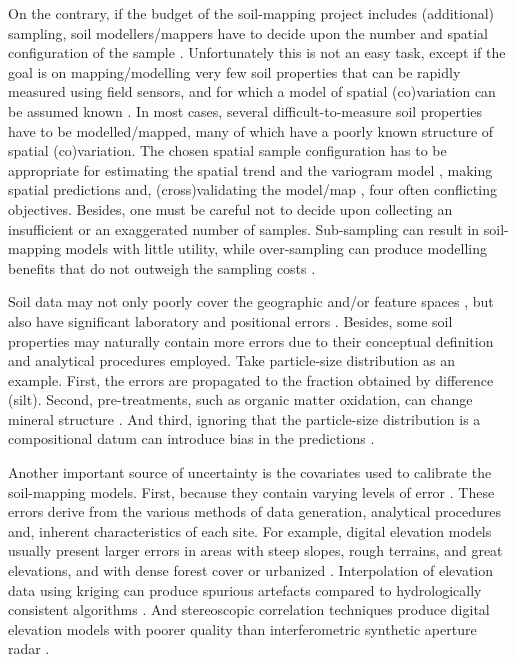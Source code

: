On the contrary, if the budget of the soil-mapping project includes (additional) sampling, soil 
modellers/mappers have to decide upon the number and spatial configuration of the sample 
\citep{deGruijterEtAl2006, WebsterEtAl2013}. Unfortunately this is not an easy task, except if the 
goal is on mapping/modelling very few soil properties that can be rapidly measured using field 
sensors, and for which a model of spatial (co)variation can be assumed known \citep{MarchantEtAl2006}.
In most cases, several difficult-to-measure soil properties have to be modelled/mapped, many of 
which have a poorly known structure of spatial (co)variation. The chosen spatial sample configuration
has to be appropriate for estimating the spatial trend \citep{HenglEtAl2003a, MinasnyEtAl2006b} and 
the variogram model \citep{WarrickEtAl1987, WebsterEtAl1992, Lark2002}, making spatial predictions 
\citep{YfantisEtAl1987, WalvoortEtAl2010} and, (cross)validating the model/map \citep{BrusEtAl2011}, 
four often conflicting objectives. Besides, one must be careful not to decide upon collecting an 
insufficient or an exaggerated number of samples. Sub-sampling can result in soil-mapping models 
with little utility, while over-sampling can produce modelling benefits that do not outweigh the
sampling costs \citep{vanGroenigenEtAl1999}.

Soil data may not only poorly cover the geographic and/or feature spaces \citep{HenglEtAl2003a}, but
also have significant laboratory and positional errors \citep{NelsonEtAl2011}. Besides, some soil 
properties may naturally contain more errors due to their conceptual definition and analytical 
procedures employed. Take particle-size distribution as an example. First, the errors are propagated
to the fraction obtained by difference (silt). Second, pre-treatments, such as organic matter 
oxidation, can change mineral structure \citep{MikuttaEtAl2005a}. And third, ignoring that the 
particle-size distribution is a compositional datum can introduce bias in the predictions 
\citep{LarkEtAl2007}.

Another important source of uncertainty is the covariates used to calibrate the soil-mapping models.
First, because they contain varying levels of error \citep{HeuvelinkEtAl1989}. These errors derive 
from the various methods of data generation, analytical procedures and, inherent characteristics of 
each site. For example, digital elevation models usually present larger errors in areas with steep 
slopes, rough terrains, and great elevations, and with dense forest cover or urbanized 
\citep{Florinsky1998, Toutin2000, FisherEtAl2006}. Interpolation of elevation data using kriging 
can produce spurious artefacts \citep{HenglEtAl2009} compared to hydrologically consistent 
algorithms \citep{Hutchinson1989}. And stereoscopic correlation techniques produce digital elevation
models with poorer quality than interferometric synthetic aperture radar \citep{HirtEtAl2010}.

